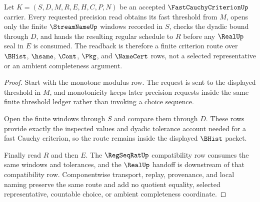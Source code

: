 \begin{theorem}
\label{thm:fast-cauchy-criterion-modulus-readback}
Let $K=(S,D,M,R,E,H,C,P,N)$ be an accepted $\FastCauchyCriterionUp$ carrier. Every requested precision read obtains its fast threshold from $M$, opens only the finite $\StreamNameUp$ windows recorded in $S$, checks the dyadic bound through $D$, and hands the resulting regular schedule to $R$ before any $\RealUp$ seal in $E$ is consumed. The readback is therefore a finite criterion route over $\BHist$, $\hsame$, $\Cont$, $\Pkg$, and $\NameCert$ rows, not a selected representative or an ambient completeness argument.
\end{theorem}
\begin{proof}
Start with the monotone modulus row. The request is sent to the displayed threshold in $M$, and monotonicity keeps later precision requests inside the same finite threshold ledger rather than invoking a choice sequence.

Open the finite windows through $S$ and compare them through $D$. These rows provide exactly the inspected values and dyadic tolerance account needed for a fast Cauchy criterion, so the route remains inside the displayed $\BHist$ packet.

Finally read $R$ and then $E$. The $\RegSeqRatUp$ compatibility row consumes the same windows and tolerances, and the $\RealUp$ handoff is downstream of that compatibility row. Componentwise transport, replay, provenance, and local naming preserve the same route and add no quotient equality, selected representative, countable choice, or ambient completeness coordinate.
\end{proof}



